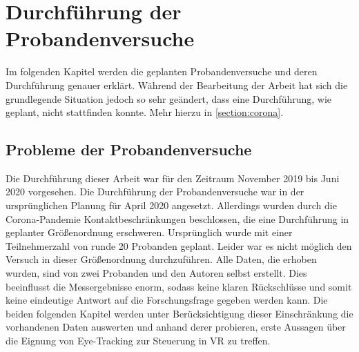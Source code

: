 
\chapter{Durchführung  der Probandenversuche} 
Im folgenden Kapitel werden die geplanten Probandenversuche und deren Durchführung genauer erklärt. Während der Bearbeitung der Arbeit hat sich die grundlegende Situation jedoch so sehr geändert, dass eine Durchführung, wie geplant, nicht stattfinden konnte. Mehr hierzu in \autoref{section:corona}.

\section{Probleme der Probandenversuche}
\label{section:corona}
Die Durchführung dieser Arbeit war für den Zeitraum November 2019 bis Juni 2020 vorgesehen. Die Durchführung der Probandenversuche war in der ursprünglichen Planung für April 2020 angesetzt. Allerdings wurden durch die Corona-Pandemie \cite{rki.2020} Kontaktbeschränkungen beschlossen, die eine Durchführung in geplanter Größenordnung erschweren. Ursprünglich wurde mit einer Teilnehmerzahl von runde 20 Probanden geplant. Leider war es nicht möglich den Versuch in dieser Größenordnung durchzuführen. Alle Daten, die erhoben wurden, sind von zwei Probanden und den Autoren selbst erstellt. Dies beeinflusst die Messergebnisse enorm, sodass keine klaren Rückschlüsse und somit keine eindeutige Antwort auf die Forschungsfrage gegeben werden kann. Die beiden folgenden Kapitel werden unter Berücksichtigung dieser Einschränkung die vorhandenen Daten auswerten und anhand derer probieren, erste Aussagen über die Eignung von Eye-Tracking zur Steuerung in VR zu treffen.

